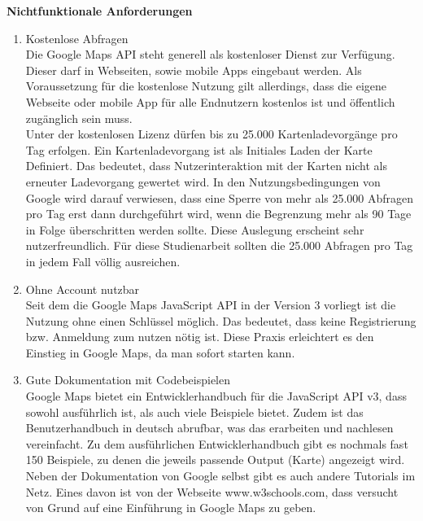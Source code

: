 \textbf{Nichtfunktionale Anforderungen}
\begin{enumerate}
\item Kostenlose Abfragen \\
Die Google Maps API steht generell als kostenloser Dienst zur Verfügung. Dieser darf in Webseiten, sowie mobile Apps eingebaut werden. Als Voraussetzung für die kostenlose Nutzung gilt allerdings, dass die eigene Webseite oder mobile App für alle Endnutzern kostenlos ist und öffentlich zugänglich sein muss.\\
Unter der kostenlosen Lizenz dürfen bis zu 25.000 Kartenladevorgänge pro Tag erfolgen. Ein Kartenladevorgang ist als Initiales Laden der Karte Definiert. Das bedeutet, dass Nutzerinteraktion mit der Karten nicht als erneuter Ladevorgang gewertet wird. 
In den Nutzungsbedingungen von Google wird darauf verwiesen, dass eine Sperre von mehr als 25.000 Abfragen pro Tag erst dann durchgeführt wird, wenn die Begrenzung mehr als 90 Tage in Folge überschritten werden sollte.
Diese Auslegung erscheint sehr nutzerfreundlich. Für diese Studienarbeit sollten die 25.000 Abfragen pro Tag in jedem Fall völlig ausreichen. \cite[Nutzungsbedingungen]{googlemaps}\cite[Lizenzierung]{googlemaps}


\item Ohne Account nutzbar\\
Seit dem die Google Maps JavaScript API in der Version 3 vorliegt ist die Nutzung ohne einen Schlüssel möglich. Das bedeutet, dass keine Registrierung bzw. Anmeldung zum nutzen nötig ist. Diese Praxis erleichtert es den Einstieg in Google Maps, da man sofort starten kann. \cite{googlemapsblog}


\item Gute Dokumentation mit Codebeispielen\\
Google Maps bietet ein Entwicklerhandbuch für die JavaScript API v3, dass sowohl ausführlich ist, als auch viele Beispiele bietet. Zudem ist das Benutzerhandbuch in deutsch abrufbar, was das erarbeiten und nachlesen vereinfacht. 
Zu dem ausführlichen Entwicklerhandbuch gibt es nochmals fast 150 Beispiele, zu denen die jeweils passende Output (Karte) angezeigt wird.\cite[Documentation]{googlemaps} \\
Neben der Dokumentation von Google selbst gibt es auch andere Tutorials im Netz. Eines davon ist von der Webseite www.w3schools.com, dass versucht von Grund auf eine Einführung in Google Maps zu geben. 



\end{enumerate}


